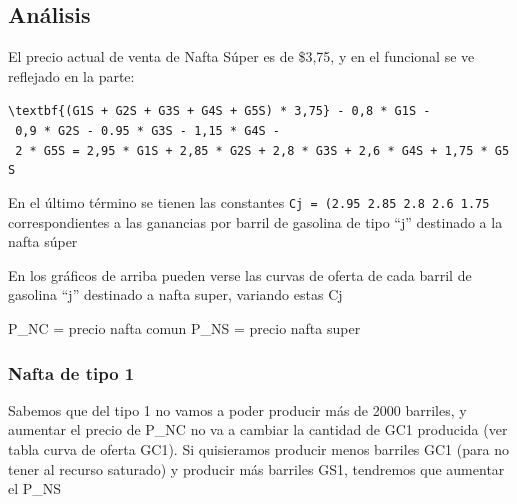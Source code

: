 \documentclass[
]{article}
\begin{document}
\hypertarget{anuxe1lisis}{%
\subsection{Análisis}\label{anuxe1lisis}}

El precio actual de venta de Nafta Súper es de \$3,75, y en el funcional
se ve reflejado en la parte:

\texttt{\textbackslash{}textbf\{(G1S\ +\ G2S\ +\ G3S\ +\ G4S\ +\ G5S)\ *\ 3,75\}\ -\ 0,8\ *\ G1S\ -\ 0,9\ *\ G2S\ -\ 0.95\ *\ G3S\ -\ 1,15\ *\ G4S\ -\ 2\ *\ G5S\ =\ 2,95\ *\ G1S\ +\ 2,85\ *\ G2S\ +\ 2,8\ *\ G3S\ +\ 2,6\ *\ G4S\ +\ 1,75\ *\ G5S}

En el último término se tienen las constantes
\texttt{Cj\ =\ (2.95\ 2.85\ 2.8\ 2.6\ 1.75} correspondientes a las
ganancias por barril de gasolina de tipo ``j'' destinado a la nafta
súper

En los gráficos de arriba pueden verse las curvas de oferta de cada
barril de gasolina ``j'' destinado a nafta super, variando estas Cj

P\_NC = precio nafta comun P\_NS = precio nafta super

\hypertarget{nafta-de-tipo-1}{%
\subsubsection{Nafta de tipo 1}\label{nafta-de-tipo-1}}

Sabemos que del tipo 1 no vamos a poder producir más de 2000 barriles, y
aumentar el precio de P\_NC no va a cambiar la cantidad de GC1 producida
(ver tabla curva de oferta GC1). Si quisieramos producir menos barriles
GC1 (para no tener al recurso saturado) y producir más barriles GS1,
tendremos que aumentar el P\_NS
\end{document}
